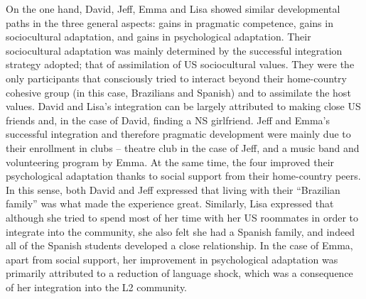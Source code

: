 \documentclass[12pt]{article}
\newenvironment{styleStandard}{\setlength\leftskip{0cm}\setlength\rightskip{0cm plus 1fil}\setlength\parindent{0cm}\setlength\parfillskip{0pt plus 1fil}\setlength\parskip{0in plus 1pt}\writerlistparindent\writerlistleftskip\leavevmode\normalfont\normalsize\writerlistlabel\ignorespaces}{\unskip\vspace{0.111in plus 0.0111in}\par}
\newcommand\writerlistleftskip{}
\newcommand\writerlistparindent{}
\newcommand\writerlistlabel{}
\begin{document}
\begin{styleStandard}
On the one hand, David, Jeff, Emma and Lisa showed similar developmental paths in the three general aspects: gains in pragmatic competence, gains in sociocultural adaptation, and gains in psychological adaptation. Their sociocultural adaptation was mainly determined by the successful integration strategy adopted; that of assimilation of US sociocultural values. They were the only participants that consciously tried to interact beyond their home-country cohesive group (in this case, Brazilians and Spanish) and to assimilate the host values. David and Lisa’s integration can be largely attributed to making close US friends and, in the case of David, finding a NS girlfriend. Jeff and Emma’s successful integration and therefore pragmatic development were mainly due to their enrollment in clubs – theatre club in the case of Jeff, and a music band and volunteering program by Emma. At the same time, the four improved their psychological adaptation thanks to social support from their home-country peers. In this sense, both David and Jeff expressed that living with their “Brazilian family” was what made the experience great. Similarly, Lisa expressed that although she tried to spend most of her time with her US roommates in order to integrate into the community, she also felt she had a Spanish family, and indeed all of the Spanish students developed a close relationship. In the case of Emma, apart from social support, her improvement in psychological adaptation was primarily attributed to a reduction of language shock, which was a consequence of her integration into the L2 community.
\end{styleStandard}
\end{document}
